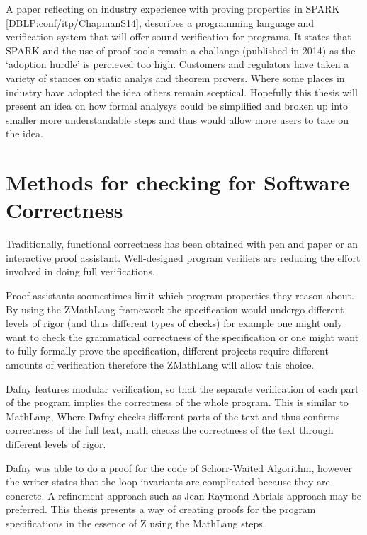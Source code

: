 A paper reflecting on industry experience with proving properties in SPARK \ref{DBLP:conf/itp/ChapmanS14}, describes a programming language and verification system that will offer sound verification for programs. It states that SPARK and the use of proof tools remain a challange (published in 2014) as the `adoption hurdle' is percieved too high. Customers and regulators have taken a variety of stances on static analys and theorem provers. Where some places in industry have adopted the idea others remain sceptical. Hopefully this thesis will present an idea on how formal analysys could be simplified and broken up into smaller more understandable steps and thus would allow more users to take on the idea.

\section{Methods for checking for Software Correctness}

Traditionally, functional correctness has been obtained with pen and paper or an interactive proof assistant. Well-designed program verifiers are reducing the effort involved in doing full verifications.

Proof assistants soomestimes limit which program properties they reason about. By using the ZMathLang framework the specification would undergo different levels of rigor (and thus different types of checks) for example one might only want to check the grammatical correctness of the specification or one might want to fully formally prove the specification, different projects require different amounts of verification therefore the ZMathLang will allow this choice.

Dafny \cite{dafny} features modular verification, so that the separate verification of each part of the program implies the correctness of the whole program. This is similar to MathLang, Where Dafny checks different parts of the text and thus confirms correctness of the full text, \gls{math} checks the correctness of the text through different levels of rigor.

Dafny was able to do a proof for the code of Schorr-Waited Algorithm, however the writer states that the loop invariants are complicated because they are concrete. A refinement approach such as Jean-Raymond Abrials approach \cite{abrial} may be preferred. This thesis presents a way of creating proofs for the program specifications in the essence of Z \cite{essenceofz} using the MathLang steps.  

